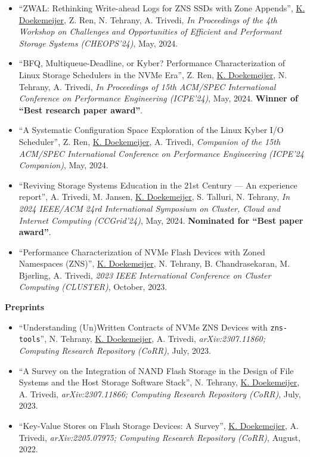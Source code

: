 \documentclass[letterpaper,11pt]{article}
\begin{document}
\begin{itemize}[label={}]
\item
  ``ZWAL: Rethinking Write-ahead Logs for ZNS SSDs with Zone Appends'', 
  \underline{K. Doekemeijer}, Z. Ren, N. Tehrany, A. Trivedi,
  \textit{In Proceedings of the 4th Workshop on Challenges and Opportunities of Efficient and Performant Storage Systems (CHEOPS'24)}, 
  May, 2024.

\item
  ``BFQ, Multiqueue-Deadline, or Kyber? Performance Characterization of Linux Storage Schedulers in the NVMe Era'', 
  Z. Ren, \underline{K. Doekemeijer}, N. Tehrany, A. Trivedi,
  \textit{In Proceedings of 15th ACM/SPEC International Conference on Performance Engineering (ICPE'24)}, 
  May, 2024. 
  \textbf{Winner of ``Best research paper award''}.

\item
  ``A Systematic Configuration Space Exploration of the Linux Kyber I/O Scheduler'', 
  Z. Ren, \underline{K. Doekemeijer}, A. Trivedi,
  \textit{Companion of the 15th ACM/SPEC International Conference on Performance Engineering (ICPE’24 Companion)}, 
  May, 2024.

\item
  ``Reviving Storage Systems Education in the 21st Century — An experience report'', 
  A. Trivedi, M. Jansen, \underline{K. Doekemeijer}, S. Talluri, N. Tehrany,
  \textit{In 2024 IEEE/ACM 24rd International Symposium on Cluster, Cloud and Internet Computing (CCGrid'24)}, 
  May, 2024. 
  \textbf{Nominated for ``Best paper award''}.

\item
  ``Performance Characterization of NVMe Flash Devices with Zoned Namespaces (ZNS)'', 
  \underline{K. Doekemeijer}, N. Tehrany, B. Chandrasekaran, M. Bjørling, A. Trivedi,
  \textit{2023 IEEE International Conference on Cluster Computing (CLUSTER)}, 
  October, 2023.

\end{itemize}

\textbf{Preprints}
\begin{itemize}[label={}]
\item
  ``Understanding (Un)Written Contracts of NVMe ZNS Devices with \texttt{zns-tools}'', 
  N. Tehrany, \underline{K. Doekemeijer}, A. Trivedi,
  \textit{arXiv:2307.11860; Computing Research Repository (CoRR)}, 
  July, 2023.

\item
  ``A Survey on the Integration of NAND Flash Storage in the Design of File Systems and the Host Storage Software Stack'', 
  N. Tehrany, \underline{K. Doekemeijer}, A. Trivedi,
  \textit{arXiv:2307.11866; Computing Research Repository (CoRR)}, 
  July, 2023.

\item
  ``Key-Value Stores on Flash Storage Devices: A Survey'', 
  \underline{K. Doekemeijer}, A. Trivedi,
  \textit{arXiv:2205.07975; Computing Research Repository (CoRR)}, 
  August, 2022.
\end{itemize}
\end{document}
